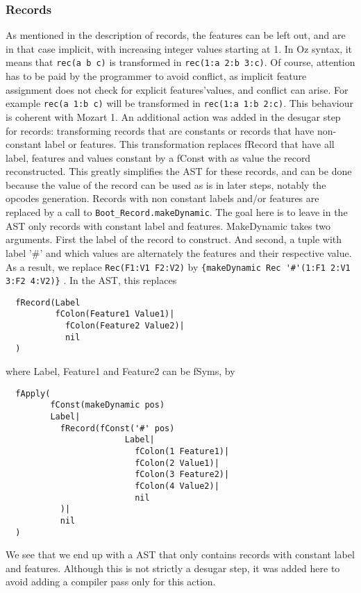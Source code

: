 \documentclass[a4paper]{memoir}
\begin{document}
\subsubsection{Records}\label{sec:arch:desugar:records}
As mentioned in the description of records, the features can be left out, and are in that case implicit, with increasing integer values starting at 1.
In Oz syntax, it means that \lstinline!rec(a b c)! is transformed in \lstinline!rec(1:a 2:b 3:c)!. Of course, attention has to be paid by the programmer to avoid conflict, as implicit feature assignment does not check for explicit features'values, and conflict can arise. For example \lstinline!rec(a 1:b c)! will be transformed in \lstinline!rec(1:a 1:b 2:c)!. This behaviour is coherent with Mozart 1. %
An additional action was added in the desugar step for records: transforming records that are constants or records that have non-constant label or features. This transformation replaces fRecord that have all label, features and values constant by a fConst with as value the record reconstructed. This greatly simplifies the AST for these records, and can be done because the value of the record can be used as is in later steps, notably the opcodes generation. 
Records with non constant labels and/or features are replaced by a call to \lstinline!Boot_Record.makeDynamic!. The goal here is to leave in the AST only records with constant label and features. MakeDynamic takes two arguments. First the label of the record to construct. And second, a tuple with label '\#' and which values are alternately the features and their respective value. As a result, we replace \lstinline!Rec(F1:V1 F2:V2)! by \lstinline!{makeDynamic Rec '#'(1:F1 2:V1 3:F2 4:V2)}! .
In the AST, this replaces 
\begin{lstlisting}
  fRecord(Label 
          fColon(Feature1 Value1)|
            fColon(Feature2 Value2)|
            nil
  )
\end{lstlisting}
where Label, Feature1 and Feature2 can be fSyms, by
\begin{lstlisting}
  fApply(
         fConst(makeDynamic pos) 
         Label|
           fRecord(fConst('#' pos) 
                        Label|
                          fColon(1 Feature1)|
                          fColon(2 Value1)|
                          fColon(3 Feature2)|
                          fColon(4 Value2)|
                          nil 
           )|
           nil
  )
\end{lstlisting}
We see that we end up with a AST that only contains records with constant label and features.
Although this is not strictly a desugar step, it was added here to avoid adding a compiler pass only for this action.
\end{document}
